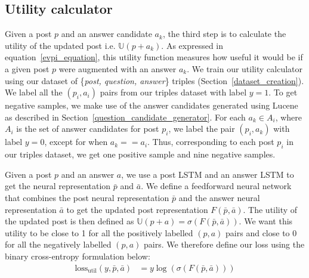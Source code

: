 \documentclass[11pt,a4paper]{article}
\newcommand{\U}{\mathbb{U}}
\begin{document}
\subsection{Utility calculator}\label{utility_calculator}
Given a post $p$ and an answer candidate $a_k$, the third step is to calculate the utility of the updated post i.e. $\U(p + a_k)$. As expressed in equation~\ref{evpi_equation}, this utility function measures how useful it would be if a given post $p$ were augmented with an answer $a_k$. We train our utility calculator using our dataset of \{\textit{post, question, answer}\} triples (Section~\ref{dataset_creation}). We label all the $(p_i, a_i)$ pairs from our triples dataset with label $y=1$. To get negative samples, we make use of the answer candidates generated using Lucene as described in Section~\ref{question_candidate_generator}. For each $a_k \in A_i$, where $A_i$ is the set of answer candidates for post $p_i$, we label the pair $(p_i, a_k)$ with label $y=0$, except for when $a_k == a_i$. Thus, corresponding to each post $p_i$ in our triples dataset, we get one positive sample and nine negative samples. 

Given a post $p$ and an answer $a$, we use a post LSTM and an answer LSTM to get the neural representation $\bar{p}$ and $\bar{a}$. We define a feedforward neural network that combines the post neural representation $\bar{p}$ and the answer neural representation $\bar{a}$ to get the updated post representation $F(\bar{p}, \bar{a})$. The utility of the updated post is then defined as $\U(p+a) = \sigma ( F(\bar{p}, \bar{a}) )$. We want this utility to be close to 1 for all the positively labelled $(p,a)$ pairs and close to 0 for all the negatively labelled $(p, a)$ pairs. We therefore define our loss using the binary cross-entropy formulation below:
%
\begin{align}\label{eq_utility_calculator}
\textrm{loss}_{\textrm{util}}(y, \bar p, \bar a) &= y \log(\sigma (F(\bar{p}, \bar{a})))
\end{align}
\end{document}

